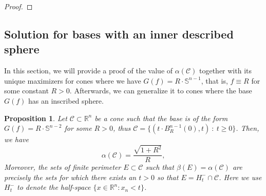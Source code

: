 \documentclass[artcle, 11pt, reqno]{amsart}
\numberwithin{equation}{section}
\newcommand{\R}{\mathbb{R}}
\newcommand{\C}{\mathcal{C}}
\theoremstyle{plain}
\newtheorem{proposition}[theorem]{Proposition}
\theoremstyle{definition}
\theoremstyle{remark}
\begin{document}
	\begin{proof}
		
	\end{proof}
	\fi
	
	\subsection{Solution for bases with an inner described sphere} \label{sec:solution}
	
	In this section, we will provide a proof of the value of $\alpha(\C)$ together with its unique maximizers for cones where we have $G(f)= R \cdot \mathbb{S}^{n-1}$, that is, $f \equiv R$ for some constant $R>0$. Afterwards, we can generalize it to cones where the base $G(f)$ has an inscribed sphere.
	
	\begin{proposition} \label{CircleProof}
		Let $\C \subset \R^n$ be a cone such that the base is of the form $G(f) = R \cdot \mathbb{S}^{n-2}$ for some $R>0$, thus $\C = \bigl\{ (t \cdot B^{n-1}_R(0),t) \: : \: t \geq 0 \bigr\}$. Then, we have
		\[
		\alpha(\C)=\frac{\sqrt{1+R^2}}{R},
		\]
		Moreover, the sets of finite perimeter $E \subset \C$ such that $\beta(E)=\alpha(\C)$ are precisely the sets for which there exists an $t>0$ so that $E = H^-_t \cap \C$. 
		Here we use $H^-_t$ to denote the half-space $\{ x \in \R^n : x_n<t\}$.
	\end{proposition}
	
\end{document}
